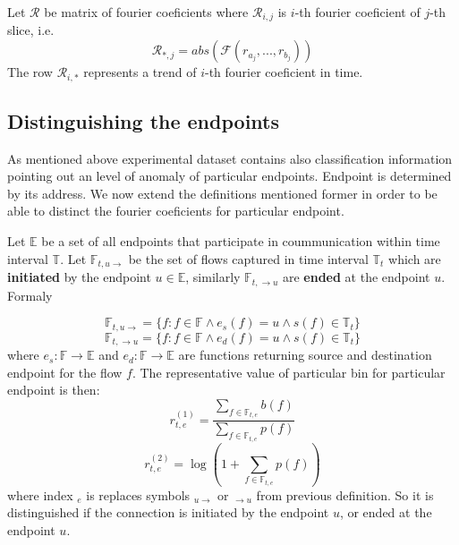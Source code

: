 Let $\mathcal{R}$ be matrix of fourier coeficients where
$\mathcal{R}_{i,j}$ is $i$-th fourier coeficient of $j$-th slice,
i.e. 
\begin{equation}
\mathcal{R}_{*,j} = abs(\mathcal{F}(r_{a_j}, ..., r_{b_j}))
\end{equation}
The row $\mathcal{R}_{i,*}$ represents a trend of $i$-th fourier
coeficient in time.

\subsection{Distinguishing the endpoints}
As mentioned above experimental dataset contains also
classification information pointing out an level of anomaly of 
particular endpoints. Endpoint is determined by its address.
We now extend the definitions mentioned
former in order to be able to distinct the fourier coeficients for
particular endpoint.

Let $\mathbb{E}$ be a set of all endpoints that
participate in coummunication within time interval $\mathbb{T}$.
Let $\mathbb{F}_{t,u \rightarrow}$ be the set of flows captured in
time interval $\mathbb{T}_{t}$ %
which are \textbf{initiated} by the endpoint $u \in \mathbb{E}$,
similarly $\mathbb{F}_{t, \rightarrow u}$ are \textbf{ended} at the
endpoint $u$. Formaly

\begin{equation}
\mathbb{F}_{t,u \rightarrow} = \{f : f \in \mathbb{F} \wedge e_{s}(f) = u \wedge s(f) \in \mathbb{T}_t \}
\end{equation}
\begin{equation}
\mathbb{F}_{t, \rightarrow u} = \{f : f \in \mathbb{F} \wedge e_{d}(f) = u \wedge s(f) \in \mathbb{T}_t \}
\end{equation}
where $e_{s}:\mathbb{F}\rightarrow \mathbb{E}$ and
$e_{d}:\mathbb{F}\rightarrow \mathbb{E}$ 
are functions returning source and destination endpoint for the 
flow $f$.
The representative value of particular bin for particular endpoint is 
then:
\begin{equation}\label{bigrepr1}
r_{t,e}^{(1)} = \frac{\sum\limits_{f\in \mathbb{F}_{t,e}}b(f)}{\sum\limits_{f\in \mathbb{F}_{t,e}}p(f)}
\end{equation}
\begin{equation}\label{bigrepr2}
r_{t,e}^{(2)} = \log(1+\sum\limits_{f\in \mathbb{F}_{t,e}}p(f))
\end{equation}
where index ${}_e$ is replaces symbols ${}_{u\rightarrow}$ or 
${}_{\rightarrow u}$ from previous definition. So it is distinguished 
if the connection is initiated by the endpoint $u$, or ended at the
endpoint $u$.

